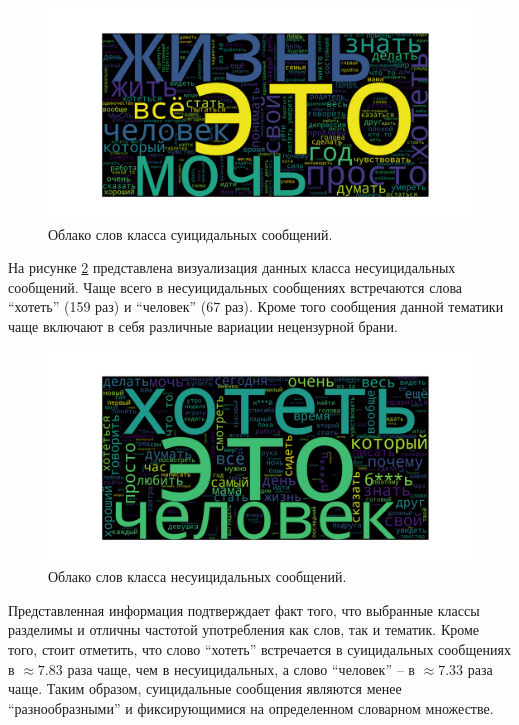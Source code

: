 \begin{figure}[H]
	\centering
	\includegraphics[width=\textwidth]{inc/cloudSuicidal.pdf}
	\caption{ Облако слов класса суицидальных сообщений. }
	\label{img:cloud1}
\end{figure}

На рисунке \ref{img:cloud2} представлена визуализация данных класса несуицидальных сообщений. Чаще всего в несуицидальных сообщениях встречаются слова ``хотеть'' (159 раз) и ``человек'' (67 раз). Кроме того сообщения данной тематики чаще включают в себя различные вариации нецензурной брани.

\begin{figure}[H]
	\centering
	\includegraphics[width=1\textwidth]{inc/cloudNonSuicidal.pdf}
	\caption{ Облако слов класса несуицидальных сообщений. }
	\label{img:cloud2}
\end{figure}

Представленная информация подтверждает факт того, что выбранные классы разделимы и отличны частотой употребления как слов, так и тематик. Кроме того, стоит отметить, что слово ``хотеть'' встречается в суицидальных сообщениях в $\approx 7.83$ раза чаще, чем в несуицидальных, а слово ``человек'' -- в $\approx 7.33$ раза чаще. Таким образом, суицидальные сообщения являются менее ``разнообразными'' и фиксирующимися на определенном словарном множестве.

